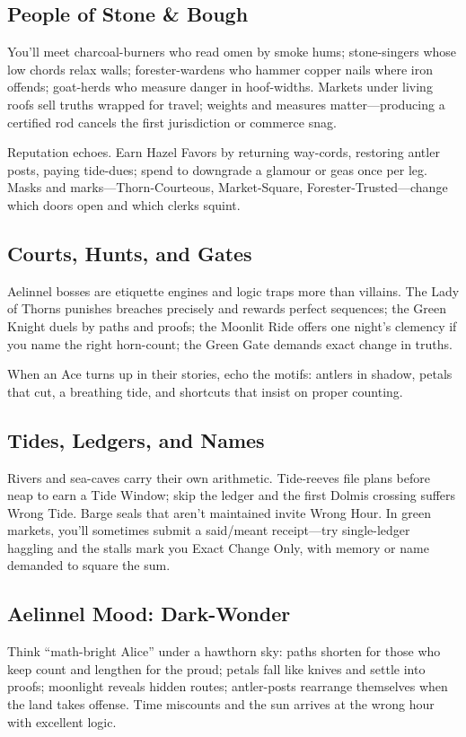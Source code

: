 \documentclass[11pt]{book}
\begin{document}
\subsection*{People of Stone \& Bough}
You'll meet charcoal-burners who read omen by smoke hums; stone-singers whose low chords relax walls; forester-wardens who hammer copper nails where iron offends; goat-herds who measure danger in hoof-widths. Markets under living roofs sell truths wrapped for travel; weights and measures matter---producing a certified rod cancels the first jurisdiction or commerce snag.

Reputation echoes. Earn Hazel Favors by returning way-cords, restoring antler posts, paying tide-dues; spend to downgrade a glamour or geas once per leg. Masks and marks---Thorn-Courteous, Market-Square, Forester-Trusted---change which doors open and which clerks squint.

\subsection*{Courts, Hunts, and Gates}
Aelinnel bosses are etiquette engines and logic traps more than villains. The Lady of Thorns punishes breaches precisely and rewards perfect sequences; the Green Knight duels by paths and proofs; the Moonlit Ride offers one night's clemency if you name the right horn-count; the Green Gate demands exact change in truths.

When an Ace turns up in their stories, echo the motifs: antlers in shadow, petals that cut, a breathing tide, and shortcuts that insist on proper counting.

\subsection*{Tides, Ledgers, and Names}
Rivers and sea-caves carry their own arithmetic. Tide-reeves file plans before neap to earn a Tide Window; skip the ledger and the first Dolmis crossing suffers Wrong Tide. Barge seals that aren't maintained invite Wrong Hour. In green markets, you'll sometimes submit a said/meant receipt---try single-ledger haggling and the stalls mark you Exact Change Only, with memory or name demanded to square the sum.

\subsection*{Aelinnel Mood: Dark-Wonder}
Think ``math-bright Alice'' under a hawthorn sky: paths shorten for those who keep count and lengthen for the proud; petals fall like knives and settle into proofs; moonlight reveals hidden routes; antler-posts rearrange themselves when the land takes offense. Time miscounts and the sun arrives at the wrong hour with excellent logic.
\end{document}
